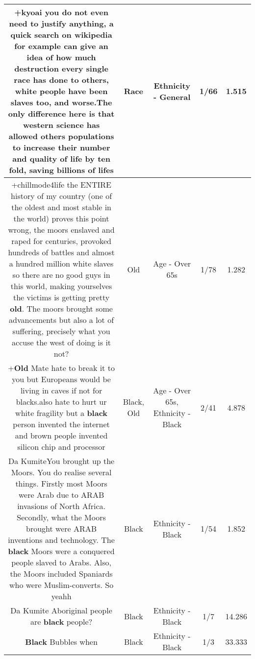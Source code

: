 \documentclass[11pt]{article}
\newlength\mylength
\begin{document}
\begin{center}
\begin{longtable}{|C{.65\mylength}|C{.30\mylength}|C{.12\mylength}|C{.12\mylength}|C{.12\mylength}|}
  \small +kyoai you do not even need to justify anything, a quick search on wikipedia for example can give an idea of how much destruction every single \textbf{race} has done to others, white people have been slaves too, and worse.The only difference here is that western science has allowed others populations to increase their number and quality of life by ten fold, saving billions of lifes\normalsize   & Race & Ethnicity - General & 1/66 & 1.515 \\  \hline
  \small +chillmode4life the ENTIRE history of my country (one of the oldest and most stable in the world) proves this point wrong, the moors enslaved and raped for centuries, provoked hundreds of battles and almost a hundred million white slaves so there are no good guys in this world, making yourselves the victims is getting pretty \textbf{old}. The moors brought some advancements but also a lot of suffering, precisely what you accuse the west of doing is it not?\normalsize   & Old & Age - Over 65s & 1/78 & 1.282 \\  \hline
  \small +\textbf{Old} Mate hate to break it to you but Europeans would be living in caves if not for blacks.also hate to hurt ur white fragility but a \textbf{black} person invented the internet and brown people invented silicon chip and processor\normalsize   & Black, Old & Age - Over 65s, Ethnicity - Black & 2/41 & 4.878 \\  \hline
  \small Da KumiteYou brought up the Moors. You do realise several things. Firstly most Moors were Arab due to ARAB invasions of North Africa. Secondly, what the Moors brought were ARAB inventions and technology. The \textbf{black} Moors were a conquered people slaved to Arabs. Also, the Moors included Spaniards who were Muslim-converts. So yeahh\normalsize   & Black & Ethnicity - Black & 1/54 & 1.852 \\  \hline
  \small Da Kumite Aboriginal people are \textbf{black} people?\normalsize   & Black & Ethnicity - Black & 1/7 & 14.286 \\  \hline
  \small \@\textbf{Black} ﻿Bubbles when\normalsize   & Black & Ethnicity - Black & 1/3 & 33.333 \\  \hline

\end{longtable}
\end{center}
\end{document}
